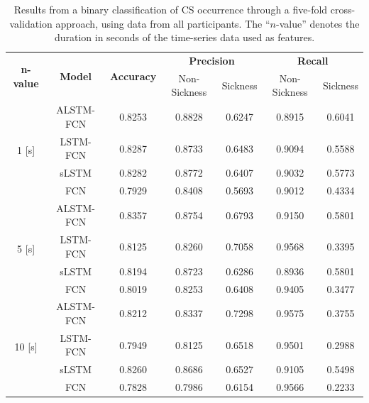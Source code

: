 \documentclass{ieeeaccess}
\begin{document}
\begin{table}[htbp!]
\caption{Results from a binary classification of CS occurrence through a five-fold cross-validation approach, using data from all participants. The “$n$-value” denotes the duration in seconds of the time-series data used as features.}
\label{tab:my-table}
\centering
\begin{tabular*}{0.68\textwidth}{c|c|c|cc|cc}
\hline
\multirow{2}{*}{\textbf{n-value}} &
  \multirow{2}{*}{\textbf{Model}} &
  \multirow{2}{*}{\textbf{Accuracy}} &
  \multicolumn{2}{c|}{\textbf{Precision}} &
  \multicolumn{2}{c}{\textbf{Recall}}\\ \cline{4-7} 
                            &           &        & \multicolumn{1}{c|}{Non-Sickness} & Sickness & \multicolumn{1}{c|}{Non-Sickness} & Sickness \\ \hline
\multirow{4}{*}{1   [s]}  & ALSTM-FCN & 0.8253 & \multicolumn{1}{c|}{0.8828}       & 0.6247   & \multicolumn{1}{c|}{0.8915}       & 0.6041   \\ \cline{2-7} 
                            & LSTM-FCN  & 0.8287 & \multicolumn{1}{c|}{0.8733}       & 0.6483   & \multicolumn{1}{c|}{0.9094}       & 0.5588   \\ \cline{2-7} 
                            & sLSTM      & 0.8282 & \multicolumn{1}{c|}{0.8772}       & 0.6407   & \multicolumn{1}{c|}{0.9032}       & 0.5773   \\ \cline{2-7} 
                            & FCN       & 0.7929 & \multicolumn{1}{c|}{0.8408}       & 0.5693   & \multicolumn{1}{c|}{0.9012}       & 0.4334   \\ \hline
\multirow{4}{*}{5   [s]}  & ALSTM-FCN & 0.8357 & \multicolumn{1}{c|}{0.8754}       & 0.6793   & \multicolumn{1}{c|}{0.9150}       & 0.5801   \\ \cline{2-7} 
                            & LSTM-FCN  & 0.8125 & \multicolumn{1}{c|}{0.8260}       & 0.7058   & \multicolumn{1}{c|}{0.9568}       & 0.3395   \\ \cline{2-7} 
                            & sLSTM      & 0.8194 & \multicolumn{1}{c|}{0.8723}       & 0.6286   & \multicolumn{1}{c|}{0.8936}       & 0.5801   \\ \cline{2-7} 
                            & FCN       & 0.8019 & \multicolumn{1}{c|}{0.8253}       & 0.6408   & \multicolumn{1}{c|}{0.9405}       & 0.3477   \\ \hline
\multirow{4}{*}{10   [s]} & ALSTM-FCN & 0.8212 & \multicolumn{1}{c|}{0.8337}       & 0.7298   & \multicolumn{1}{c|}{0.9575}       & 0.3755   \\ \cline{2-7} 
                            & LSTM-FCN  & 0.7949 & \multicolumn{1}{c|}{0.8125}       & 0.6518   & \multicolumn{1}{c|}{0.9501}       & 0.2988   \\ \cline{2-7} 
                            & sLSTM      & 0.8260 & \multicolumn{1}{c|}{0.8686}       & 0.6527   & \multicolumn{1}{c|}{0.9105}       & 0.5498   \\ \cline{2-7} 
                            & FCN       & 0.7828 & \multicolumn{1}{c|}{0.7986}       & 0.6154   & \multicolumn{1}{c|}{0.9566}       & 0.2233   \\ \hline
\end{tabular*}
\end{table}
\end{document}
